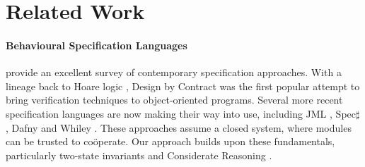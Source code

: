 \section{Related Work} 


\paragraph{Behavioural Specification Languages} 

\cite{behavSurvey2012} provide an excellent survey of
contemporary specification approaches.  With a lineage back to Hoare
logic \cite{Hoare69},  Design by Contract \cite{Meyer97} was the
first popular attempt to bring verification techniques to
object-oriented programs.  Several more recent specification languages are now making
their way into use, including JML
\cite{Leavens-etal07}, Spec$\sharp$ \cite{BarLeiSch05}, Dafny
\cite{dafny} and Whiley \cite{whiley15}. 
These approaches assume a closed system, where modules
can be trusted to co{\"o}perate. 
Our approach builds upon
these fundamentals, particularly 
two-state invariants \cite{usingHistory} and Considerate Reasoning \cite{Considerate}.
%



